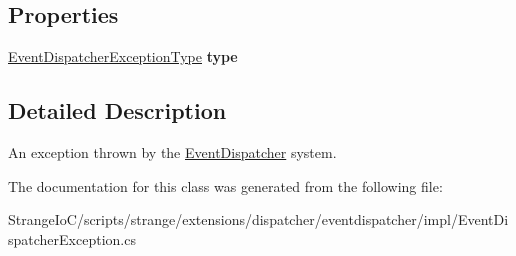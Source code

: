 \subsection*{Properties}
\begin{DoxyCompactItemize}
\item 
\hypertarget{classstrange_1_1extensions_1_1dispatcher_1_1eventdispatcher_1_1impl_1_1_event_dispatcher_exception_a9e589f2c5891b9838d7e9d5b6fe9600f}{\hyperlink{namespacestrange_1_1extensions_1_1dispatcher_1_1eventdispatcher_1_1api_ac82e4192fcc43ba5e64f0469a3c7c06d}{Event\-Dispatcher\-Exception\-Type} {\bfseries type}}\label{classstrange_1_1extensions_1_1dispatcher_1_1eventdispatcher_1_1impl_1_1_event_dispatcher_exception_a9e589f2c5891b9838d7e9d5b6fe9600f}

\end{DoxyCompactItemize}


\subsection{Detailed Description}
An exception thrown by the \hyperlink{classstrange_1_1extensions_1_1dispatcher_1_1eventdispatcher_1_1impl_1_1_event_dispatcher}{Event\-Dispatcher} system. 

The documentation for this class was generated from the following file\-:\begin{DoxyCompactItemize}
\item 
Strange\-Io\-C/scripts/strange/extensions/dispatcher/eventdispatcher/impl/Event\-Dispatcher\-Exception.\-cs\end{DoxyCompactItemize}
